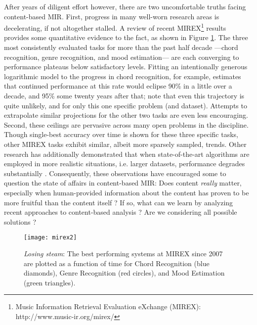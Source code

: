 After years of diligent effort however, there are two uncomfortable truths facing content-based MIR.
First, progress in many well-worn research areas is decelerating, if not altogether stalled.
A review of recent MIREX\footnote{Music Information Retrieval Evaluation eXchange (MIREX): {http://www.music-ir.org/mirex/}} results provides some quantitative evidence to the fact, as shown in Figure \ref{fig:mirex}.
The three most consistently evaluated tasks for more than the past half decade ---chord recognition, genre recognition, and mood estimation--- are each converging to performance plateaus below satisfactory levels.
Fitting an intentionally generous logarithmic model to the progress in chord recognition, for example, estimates that continued performance at this rate would eclipse 90\% in a little over a decade, and 95\% some twenty years after that; note that even this trajectory is quite unlikely, and for only this one specific problem (and dataset).
Attempts to extrapolate similar projections for the other two tasks are even less encouraging.
Second, these ceilings are pervasive across many open problems in the discipline.
Though single-best accuracy over time is shown for these three specific tasks, other MIREX tasks exhibit similar, albeit more sparsely sampled, trends.
Other research has additionally demonstrated that when state-of-the-art algorithms are employed in more realistic situations, i.e. larger datasets, performance degrades substantially \cite{BertinMahieux2012}.
Consequently, these observations have encouraged some to question the state of affairs in content-based MIR:
Does content \emph{really} matter, especially when human-provided information about the content has proven to be more fruitful than the content itself \cite{Slaney2011}? 
If so, what can we learn by analyzing recent approaches to content-based analysis \cite{Flexer2012}? 
Are we considering all possible solutions \cite{Humphrey2012a}? 

\begin{figure}
\begin{centering}
\texttt{[image: mirex2]}
\caption{\emph{Losing steam}: The best performing systems at MIREX since 2007 are plotted as a function of time for Chord Recognition (blue diamonds), Genre Recognition (red circles), and Mood Estimation (green triangles).}
\label{fig:mirex}
\end{centering}
\end{figure}


